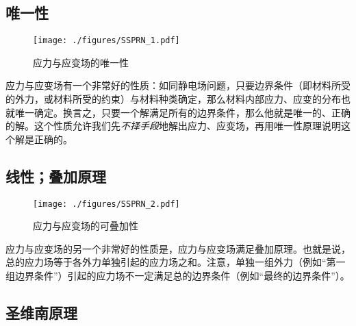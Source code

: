 
\begin{issues}
\issueDraft
\end{issues}

\subsection{唯一性}
\begin{figure}[ht]
\centering
\texttt{[image: ./figures/SSPRN\_1.pdf]}
\caption{应力与应变场的唯一性} \label{SSPRN_fig1}
\end{figure}
应力与应变场有一个非常好的性质：如同静电场问题，只要边界条件（即材料所受的外力，或材料所受的约束）与材料种类确定，那么材料内部应力、应变的分布也就唯一确定。换言之，只要一个解满足所有的边界条件，那么他就是唯一的、正确的解。这个性质允许我们先\textsl{不择手段}地解出应力、应变场，再用唯一性原理说明这个解是正确的。

\subsection{线性；叠加原理}
\begin{figure}[ht]
\centering
\texttt{[image: ./figures/SSPRN\_2.pdf]}
\caption{应力与应变场的可叠加性} \label{SSPRN_fig2}
\end{figure}
应力与应变场的另一个非常好的性质是，应力与应变场满足叠加原理。也就是说，总的应力场等于各外力单独引起的应力场之和。注意，单独一组外力（例如“第一组边界条件”）引起的应力场不一定满足总的边界条件（例如“最终的边界条件”）。

\subsection{圣维南原理}
